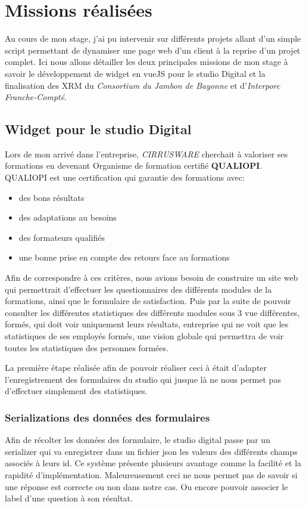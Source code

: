 \section{Missions réalisées}
Au cours de mon stage, j'ai pu intervenir sur différents projets allant d'un simple script permettant de dynamiser une page web d'un client à la reprise d'un projet complet. Ici nous allons détailler les deux principales missions de mon stage à savoir le développement de widget en vueJS pour le studio Digital et la finalisation des XRM du \textit{Consortium du Jambon de Bayonne} et d'\textit{Interporc Franche-Compté}.

\subsection{Widget pour le studio Digital}
Lors de mon arrivé dans l'entreprise, \textit{CIRRUSWARE} cherchait à valoriser ses formations en devenant Organisme de formation certifié \textbf{QUALIOPI}. QUALIOPI est une certification qui garantie des formations avec: 
\begin{itemize}
    \item des bons résultats
    \item des adaptations au besoins
    \item des formateurs qualifiés
    \item une bonne prise en compte des retours face au formations
\end{itemize} 
Afin de correspondre à ces critères, nous avions besoin de construire un site web qui permettrait d'effectuer les questionnaires des différents modules de la formations, ainsi que le formulaire de satisfaction. Puis par la suite de pouvoir consulter les différentes statistiques des différents modules sous 3 vue différentes, formés, qui doit voir uniquement leurs résultats, entreprise qui ne voit que les statistiques de ses employés formés, une vision globale qui permettra de voir toutes les statistiques des personnes formées.

La première étape réalisée afin de pouvoir réaliser ceci à était d'adapter l'enregistrement des formulaires du studio qui jusque là ne nous permet pas d'effectuer simplement des statistiques. 

\subsubsection{Serializations des données des formulaires}

Afin de récolter les données des formulaire, le studio digital passe par un serializer qui va enregistrer dans un fichier json les valeurs des différents champs associés à leurs id. Ce système présente plusieurs avantage comme la facilité et la rapidité d'implémentation. Maleureusement ceci ne nous permet pas de savoir si une réponse est correcte ou non dans notre cas. Ou encore pouvoir associer le label d'une question à son résultat. 

